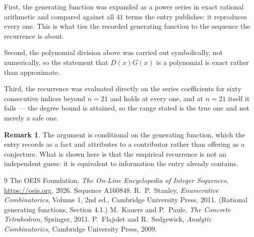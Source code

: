\documentclass[11pt,a4paper]{article}
\theoremstyle{plain}
\theoremstyle{definition}
\newtheorem{remark}[theorem]{Remark}
\begin{document}
First, the generating function was expanded as a power series in exact rational arithmetic and
compared against all $41$ terms the entry publishes: it reproduces every one. This is
what ties the recorded generating function to the sequence the recurrence is about.

Second, the polynomial division above was carried out symbolically, not numerically, so the
statement that $D(x)G(x)$ is a polynomial is exact rather than approximate.

Third, the recurrence was evaluated directly on the series coefficients for sixty consecutive
indices beyond $n=21$ and holds at every one, and at $n=21$ itself it fails --- the
degree bound is attained, so the range stated is the true one and not merely a safe one.

\begin{remark}
The argument is conditional on the generating function, which the entry records as a fact and
attributes to a contributor rather than offering as a conjecture. What is shown here is that
the empirical recurrence is not an independent guess: it is equivalent to information the
entry already contains.
\end{remark}

\begin{thebibliography}{9}
 The OEIS Foundation, \emph{The On-Line Encyclopedia of Integer
Sequences}, \url{https://oeis.org}, 2026. Sequence A160848.
 R.~P.~Stanley, \emph{Enumerative Combinatorics}, Volume 1, 2nd ed.,
Cambridge University Press, 2011. (Rational generating functions, Section 4.1.)
 M.~Kauers and P.~Paule, \emph{The Concrete Tetrahedron}, Springer, 2011.
 P.~Flajolet and R.~Sedgewick, \emph{Analytic Combinatorics}, Cambridge
University Press, 2009.
\end{thebibliography}
\end{document}
